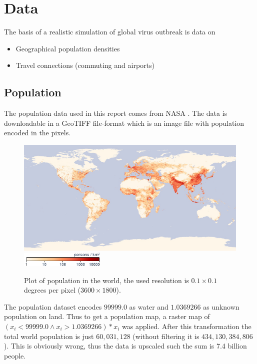 \section{Data}

The basis of a realistic simulation of global virus outbreak is data on
\begin{itemize}
	\item Geographical population densities
	\item Travel connections (commuting and airports)
\end{itemize}

\subsection{Population}
The population data used in this report comes from NASA \cite{nasa-population}. The data is downloadable in a GeoTIFF file-format which is an image file with population encoded in the pixels.

\begin{figure}[H]
	\centering
	\includegraphics[width=1.0 \textwidth]{plots/nasa_population}
	\includegraphics[width=4cm]{plots/nasa_population_colorbar}
	\caption{Plot of population in the world, the used resolution is $0.1 \times 0.1$ degrees per pixel ($3600 \times 1800$).}
\end{figure}

The population dataset encodes $99999.0$ as water and $1.0369266$ as unknown population on land. Thus to get a population map, a raster map of $(x_i < 99999.0 \wedge x_i > 1.0369266) * x_i$ was applied. After this transformation the total world population is just $60,031,128$ (without filtering it is $434,130,384,806$). This is obviously wrong, thus the data is upscaled such the sum is 7.4 billion people.

